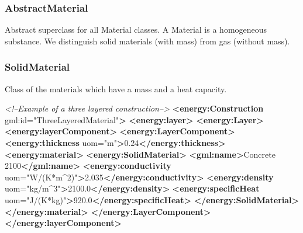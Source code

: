 \documentclass[a4paper,12pt]{article}
\newenvironment{Shaded}{}{}
\newcommand{\KeywordTok}[1]{\textcolor[rgb]{0.00,0.44,0.13}{\textbf{{#1}}}}
\newcommand{\StringTok}[1]{\textcolor[rgb]{0.25,0.44,0.63}{{#1}}}
\newcommand{\CommentTok}[1]{\textcolor[rgb]{0.38,0.63,0.69}{\textit{{#1}}}}
\newcommand{\OtherTok}[1]{\textcolor[rgb]{0.00,0.44,0.13}{{#1}}}
\newcommand{\NormalTok}[1]{{#1}}
\begin{document}
\subsubsection{AbstractMaterial}\label{abstractmaterial}

Abstract superclass for all Material classes. A Material is a
homogeneous substance. We distinguish solid materials (with mass) from
gas (without mass).

\subsubsection{SolidMaterial}\label{solidmaterial}

Class of the materials which have a mass and a heat capacity.

\begin{Shaded}
\begin{Highlighting}[]
\CommentTok{<!--Example of a three layered construction-->}
\KeywordTok{<energy:Construction}\OtherTok{ gml:id=}\StringTok{"ThreeLayeredMaterial"}\KeywordTok{>}
    \KeywordTok{<energy:layer>}
        \KeywordTok{<energy:Layer>}
            \KeywordTok{<energy:layerComponent>}
                \KeywordTok{<energy:LayerComponent>}
                    \KeywordTok{<energy:thickness}\OtherTok{ uom=}\StringTok{"m"}\KeywordTok{>}\NormalTok{0.24}\KeywordTok{</energy:thickness>}
                    \KeywordTok{<energy:material>}
                        \KeywordTok{<energy:SolidMaterial>}
                            \KeywordTok{<gml:name>}\NormalTok{Concrete 2100}\KeywordTok{</gml:name>}
                            \KeywordTok{<energy:conductivity}\OtherTok{ uom=}\StringTok{"W/(K*m^2)"}\KeywordTok{>}\NormalTok{2.035}\KeywordTok{</energy:conductivity>}
                            \KeywordTok{<energy:density}\OtherTok{ uom=}\StringTok{"kg/m^3"}\KeywordTok{>}\NormalTok{2100.0}\KeywordTok{</energy:density>}
                            \KeywordTok{<energy:specificHeat}\OtherTok{ uom=}\StringTok{"J/(K*kg)"}\KeywordTok{>}\NormalTok{920.0}\KeywordTok{</energy:specificHeat>}
                        \KeywordTok{</energy:SolidMaterial>}
                    \KeywordTok{</energy:material>}
                \KeywordTok{</energy:LayerComponent>}
            \KeywordTok{</energy:layerComponent>}


\end{Highlighting}
\end{Shaded}
\end{document}
